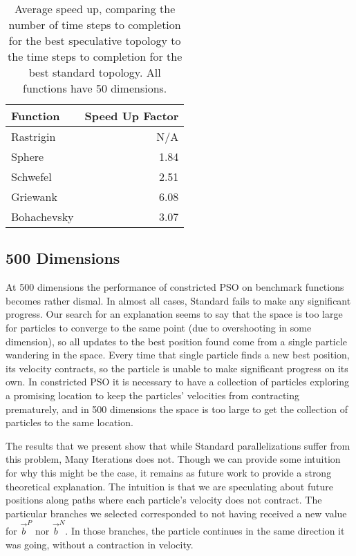 \documentclass[smallcondensed]{svjour3}
\providecommand{\pers}{\ensuremath{P}}
\providecommand{\neigh}{\ensuremath{N}}
\providecommand{\nbest}{\ensuremath{\Vec{b}^\neigh}}
\providecommand{\pbest}{\ensuremath{\Vec{b}^\pers}}
\begin{document}
\begin{table}
  \caption{Average speed up, comparing the number of time steps to completion
  for the best speculative topology to the time steps to completion for the
  best standard topology.  All functions have 50 dimensions.}
  \label{tab:50dims-summary}
  \centering
  \begin{tabular}{|l|r|}
	\hline
	Function&Speed Up Factor\\
	\hline
	\hline
	Rastrigin&N/A\\
	\hline
	Sphere&1.84\\
	\hline
	Schwefel&2.51\\
	\hline
	Griewank&6.08\\
	\hline
	Bohachevsky&3.07\\
	\hline
  \end{tabular}
\end{table}

\subsection{500 Dimensions}
\label{sec:500dims}

At 500 dimensions the performance of constricted PSO on benchmark functions
becomes rather dismal.  In almost all cases, Standard fails to make any
significant progress.  Our search for an explanation seems to say that the
space is too large for particles to converge to the same point (due to
overshooting in some dimension), so all updates to the best position found come
from a single particle wandering in the space.  Every time that single particle
finds a new best position, its velocity contracts, so the particle is unable to
make significant progress on its own.  In constricted PSO it is necessary to
have a collection of particles exploring a promising location to keep the
particles' velocities from contracting prematurely, and in 500 dimensions the
space is too large to get the collection of particles to the same location.

The results that we present show that while Standard parallelizations suffer
from this problem, Many Iterations does not.  Though we can provide some
intuition for why this might be the case, it remains as future work to provide
a strong theoretical explanation.  The intuition is that we are speculating
about future positions along paths where each particle's velocity does not
contract.  The particular branches we selected corresponded to not having
received a new value for $\pbest$ nor $\nbest$.  In those branches, the
particle continues in the same direction it was going, without a contraction in
velocity.
\end{document}

